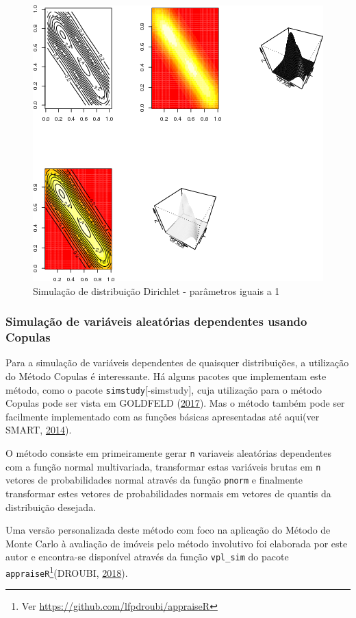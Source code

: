 \documentclass[a4paper]{article}
\let\rmarkdownfootnote\footnote%
\def\footnote{\protect\rmarkdownfootnote}
\begin{document}
\begin{figure}[H]

{\centering \includegraphics[width=0.7\linewidth]{images/dirichlet-1} 

}

\caption{Simulação de distribuição Dirichlet - parâmetros iguais a 1}\label{fig:dirichlet}
\end{figure}

\subsubsection{Simulação de variáveis aleatórias dependentes usando
Copulas}\label{simulacao-de-variaveis-aleatorias-dependentes-usando-copulas}

Para a simulação de variáveis dependentes de quaisquer distribuições, a
utilização do Método Copulas é interessante. Há alguns pacotes que
implementam este método, como o pacote \texttt{simstudy}{[}-simstudy{]},
cuja utilização para o método Copulas pode ser vista em GOLDFELD
(\protect\hyperlink{ref-Copulas}{2017}). Mas o método também pode ser
facilmente implementado com as funções básicas apresentadas até aqui(ver
SMART, \protect\hyperlink{ref-econometrics}{2014}).

O método consiste em primeiramente gerar \texttt{n} variaveis aleatórias
dependentes com a função normal multivariada, transformar estas
variáveis brutas em \texttt{n} vetores de probabilidades normal através
da função \texttt{pnorm} e finalmente transformar estes vetores de
probabilidades normais em vetores de quantis da distribuição desejada.

Uma versão personalizada deste método com foco na aplicação do Método de
Monte Carlo à avaliação de imóveis pelo método involutivo foi elaborada
por este autor e encontra-se disponível através da função
\texttt{vpl\_sim} do pacote \texttt{appraiseR}\footnote{Ver
  \url{https://github.com/lfpdroubi/appraiseR}}(DROUBI,
\protect\hyperlink{ref-appraiseR}{2018}).
\end{document}

